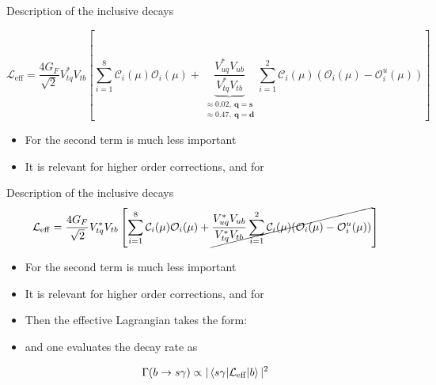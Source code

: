 \documentclass[xcolor=dvipsnames]{beamer}
\begin{document}
\begin{frame}{Description of the inclusive decays}
   \small

   \begin{equation}\nonumber
      \mathcal{L}_{\mathrm{eff}} = \frac{4G_F}{\sqrt{2}}V_{tq}^*V_{tb}\left[\sum^{8}_{i=1}\mathcal{C}_i(\mu)\mathcal{O}_i(\mu)
                                                  + {\underbrace{\frac{V^*_{uq}V_{ub}}{V^*_{tq}V_{tb}}}_{\substack{\approx 0.02,~\mathbf{q = s}\\\approx 0.47,~\mathbf{q = d}}}}\sum^{2}_{i=1}\mathcal{C}_i(\mu)(\mathcal{O}_i(\mu)-\mathcal{O}_i^u(\mu))\right]
   \end{equation}

\begin{itemize}
   \item For \btosgamma the second term is much less important
   \item It is relevant for higher order corrections, and for \btodgamma
\end{itemize}

\end{frame}

\begin{frame}{Description of the inclusive decays}
\small
   \begin{equation}\nonumber
      \mathcal{L}_{\mathrm{eff}} = \frac{4G_F}{\sqrt{2}}V_{tq}^*V_{tb}\left[\sum^{8}_{i=1}\mathcal{C}_i(\mu)\mathcal{O}_i(\mu)
                                                  + \cancel{\frac{V^*_{uq}V_{ub}}{V^*_{tq}V_{tb}}\sum^{2}_{i=1}\mathcal{C}_i(\mu)(\mathcal{O}_i(\mu)-\mathcal{O}_i^u(\mu))}\right]
   \end{equation}

\begin{itemize}
   \item For \btosgamma the second term is much less important
   \item It is relevant for higher order corrections, and for \btodgamma
   \item[\ra] Then the effective Lagrangian takes the form:
\end{itemize}

\vspace{-15pt}



\begin{itemize}
   \item and one evaluates the decay rate as 
\end{itemize}

\vspace{-10pt}

\begin{equation}\nonumber
   \Gamma({b\rightarrow s\gamma})\propto|\mel**{s\gamma}{\mathcal{L}_{\mathrm{eff}}}{b}|^2
\end{equation}

\end{frame}
\end{document}
